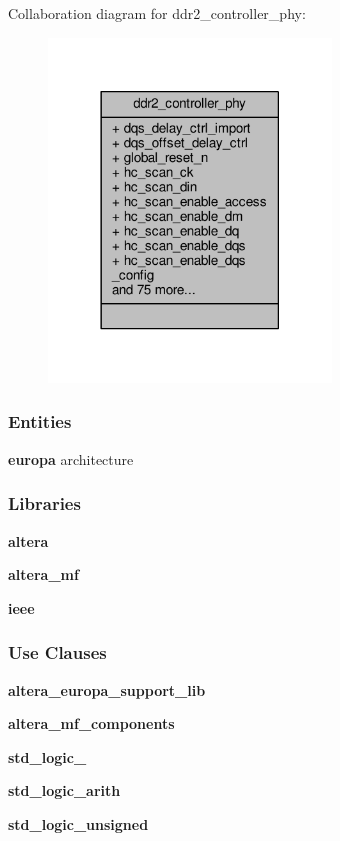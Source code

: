 Collaboration diagram for ddr2\+\_\+controller\+\_\+phy\+:\nopagebreak
\begin{figure}[H]
\begin{center}
\leavevmode
\includegraphics[width=213pt]{da/dea/classddr2__controller__phy__coll__graph}
\end{center}
\end{figure}
\subsubsection*{Entities}
\begin{DoxyCompactItemize}
\item 
{\bf europa} architecture
\end{DoxyCompactItemize}
\subsubsection*{Libraries}
 \begin{DoxyCompactItemize}
\item 
{\bf altera} 
\item 
{\bf altera\+\_\+mf} 
\item 
{\bf ieee} 
\end{DoxyCompactItemize}
\subsubsection*{Use Clauses}
 \begin{DoxyCompactItemize}
\item 
{\bf altera\+\_\+europa\+\_\+support\+\_\+lib}   
\item 
{\bf altera\+\_\+mf\+\_\+components}   
\item 
{\bf std\+\_\+logic\+\_}   
\item 
{\bf std\+\_\+logic\+\_\+arith}   
\item 
{\bf std\+\_\+logic\+\_\+unsigned}   
\end{DoxyCompactItemize}
